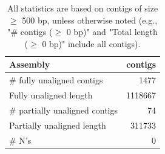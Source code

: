 \documentclass[12pt,a4paper]{article}
\begin{document}
\begin{table}[ht]
\begin{center}
\caption{All statistics are based on contigs of size $\geq$ 500 bp, unless otherwise noted (e.g., "\# contigs ($\geq$ 0 bp)" and "Total length ($\geq$ 0 bp)" include all contigs).}
\begin{tabular}{|l*{1}{|r}|}
\hline
Assembly & contigs \\ \hline
\# fully unaligned contigs & 1477 \\ \hline
Fully unaligned length & 1118667 \\ \hline
\# partially unaligned contigs & 74 \\ \hline
Partially unaligned length & 311733 \\ \hline
\# N's & 0 \\ \hline
\end{tabular}
\end{center}
\end{table}
\end{document}
